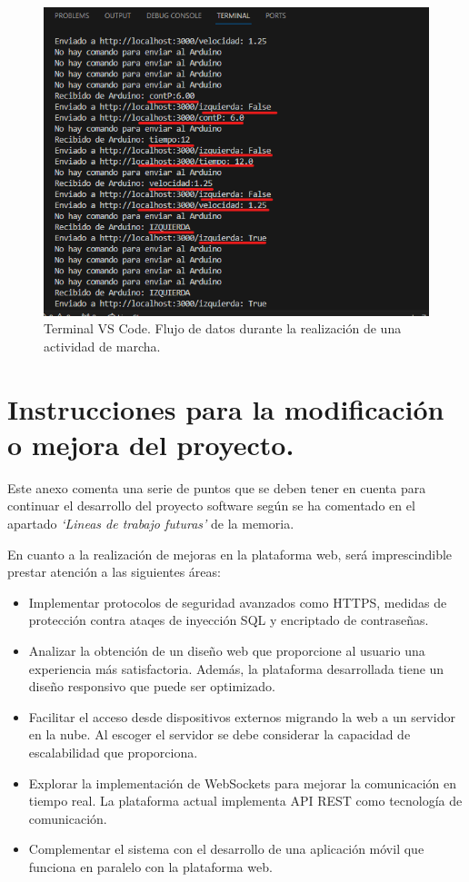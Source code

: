 \begin{figure}[h]
    \centering
    \includegraphics[width=1\textwidth]{img/C2_PruebasSistema/datosActividad.png}
    \caption{Terminal VS Code. Flujo de datos durante la realización de una actividad de marcha.}
    \label{fig:datosActividad}
\end{figure}


\section{Instrucciones para la modificación o mejora del proyecto.}

Este anexo comenta una serie de puntos que se deben tener en cuenta para continuar el desarrollo del proyecto software según se ha comentado en el apartado \textit{`Lineas de trabajo futuras'} de la memoria.

En cuanto a la realización de mejoras en la plataforma web, será imprescindible prestar atención a las siguientes áreas:
\begin{itemize}
    \item Implementar protocolos de seguridad avanzados como HTTPS, medidas de protección contra ataqes de inyección SQL y encriptado de contraseñas.
    \item Analizar la obtención de un diseño web que proporcione al usuario una experiencia más satisfactoria. Además, la plataforma desarrollada tiene un diseño responsivo que puede ser optimizado.
    \item Facilitar el acceso desde dispositivos externos migrando la web a un servidor en la nube. Al escoger el servidor se debe considerar la capacidad de escalabilidad que proporciona.
    \item Explorar la implementación de WebSockets para mejorar la comunicación en tiempo real. La plataforma actual implementa API REST como tecnología de comunicación.
    \item Complementar el sistema con el desarrollo de una aplicación móvil que funciona en paralelo con la plataforma web.
\end{itemize}

